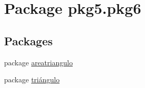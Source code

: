 \hypertarget{namespacepkg5_1_1pkg6}{}\section{Package pkg5.\+pkg6}
\label{namespacepkg5_1_1pkg6}
\subsection*{Packages}
\begin{DoxyCompactItemize}
\item 
package \mbox{\hyperlink{namespacepkg5_1_1pkg6_1_1areatriangulo}{areatriangulo}}
\item 
package \mbox{\hyperlink{namespacepkg5_1_1pkg6_1_1tri_xC3_xA1ngulo}{triángulo}}
\end{DoxyCompactItemize}
